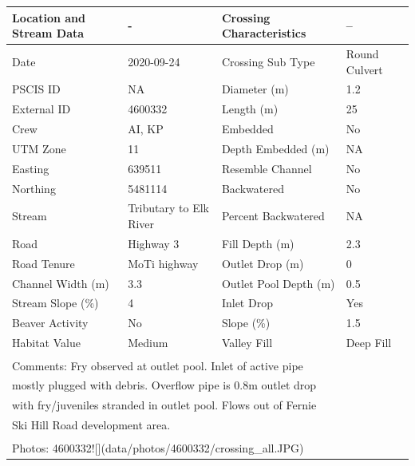 \documentclass[
]{book}
\begin{document}
\begin{tabular}{llll}
\toprule
Location and Stream Data & - & Crossing Characteristics & --\\
\midrule
Date & 2020-09-24 & Crossing Sub Type & Round Culvert\\
PSCIS ID & NA & Diameter (m) & 1.2\\
External ID & 4600332 & Length (m) & 25\\
Crew & AI, KP & Embedded & No\\
UTM Zone & 11 & Depth Embedded (m) & NA\\
\addlinespace
Easting & 639511 & Resemble Channel & No\\
Northing & 5481114 & Backwatered & No\\
Stream & Tributary to Elk River & Percent Backwatered & NA\\
Road & Highway 3 & Fill Depth (m) & 2.3\\
Road Tenure & MoTi highway & Outlet Drop (m) & 0\\
\addlinespace
Channel Width (m) & 3.3 & Outlet Pool Depth (m) & 0.5\\
Stream Slope (\%) & 4 & Inlet Drop & Yes\\
Beaver Activity & No & Slope (\%) & 1.5\\
Habitat Value & Medium & Valley Fill & Deep Fill\\
\bottomrule
\multicolumn{4}{l}{\textsuperscript{} Comments: Fry observed at outlet pool.  Inlet of active pipe}\\
\multicolumn{4}{l}{mostly plugged with debris. Overflow pipe is 0.8m outlet drop}\\
\multicolumn{4}{l}{with fry/juveniles stranded in outlet pool.  Flows out of Fernie}\\
\multicolumn{4}{l}{Ski Hill Road development area.}\\
\multicolumn{4}{l}{\textsuperscript{} Photos: 4600332![](data/photos/4600332/crossing\_all.JPG)}\\
\end{tabular}
\end{document}
